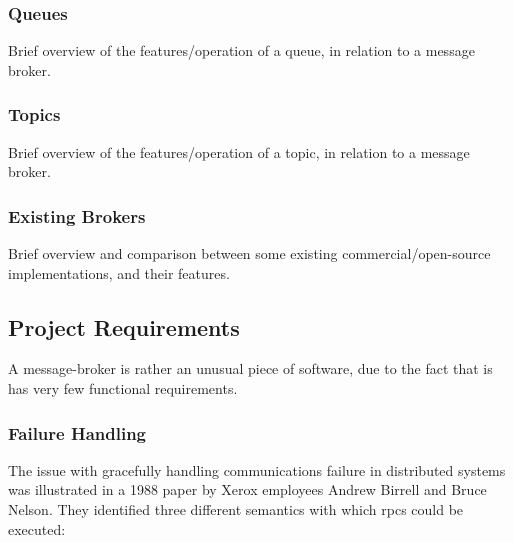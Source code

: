 \subsubsection{Queues}
\label{subs:Queues}

Brief overview of the features/operation of a queue, in relation to a message broker.


\subsubsection{Topics}
\label{subs:Topics}

Brief overview of the features/operation of a topic, in relation to a message broker.

\subsubsection{Existing Brokers}
\label{subs:Existing Brokers}

Brief overview and comparison between some existing commercial/open-source
implementations, and their features.


\subsection{Project Requirements}
\label{sub:SLA/QoS Specification}

A message-broker is rather an unusual piece of software, due to the fact that is has very few functional requirements.

\subsubsection{Failure Handling}
\label{subs:Failure Handling}

The issue with gracefully handling communications failure in distributed systems
was illustrated in a 1988 paper by Xerox employees
Andrew Birrell and Bruce Nelson\cite{Birrell:1988:IRP:59309.59336}. They identified
three different semantics with which \glspl{rpc} could be executed:

